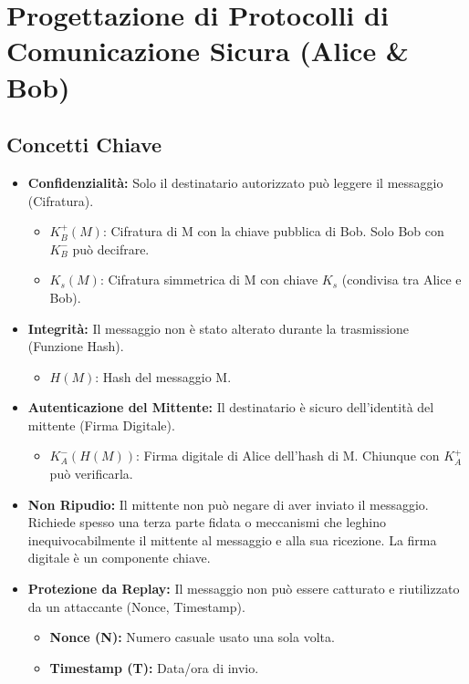\section{Progettazione di Protocolli di Comunicazione Sicura (Alice \& Bob)}
\label{sec:protocolli-sicuri}

\subsection{Concetti Chiave}
\begin{itemize}
    \item \textbf{Confidenzialità:} Solo il destinatario autorizzato può leggere il messaggio (Cifratura).
    \begin{itemize}
        \item $K_B^+(M)$: Cifratura di M con la chiave pubblica di Bob. Solo Bob con $K_B^-$ può decifrare.
        \item $K_s(M)$: Cifratura simmetrica di M con chiave $K_s$ (condivisa tra Alice e Bob).
    \end{itemize}
    \item \textbf{Integrità:} Il messaggio non è stato alterato durante la trasmissione (Funzione Hash).
    \begin{itemize}
        \item $H(M)$: Hash del messaggio M.
    \end{itemize}
    \item \textbf{Autenticazione del Mittente:} Il destinatario è sicuro dell'identità del mittente (Firma Digitale).
    \begin{itemize}
        \item $K_A^-(H(M))$: Firma digitale di Alice dell'hash di M. Chiunque con $K_A^+$ può verificarla.
    \end{itemize}
    \item \textbf{Non Ripudio:} Il mittente non può negare di aver inviato il messaggio. Richiede spesso una terza parte fidata o meccanismi che leghino inequivocabilmente il mittente al messaggio e alla sua ricezione. La firma digitale è un componente chiave.
    \item \textbf{Protezione da Replay:} Il messaggio non può essere catturato e riutilizzato da un attaccante (Nonce, Timestamp).
    \begin{itemize}
        \item \textbf{Nonce (N):} Numero casuale usato una sola volta.
        \item \textbf{Timestamp (T):} Data/ora di invio.
    \end{itemize}
\end{itemize}

